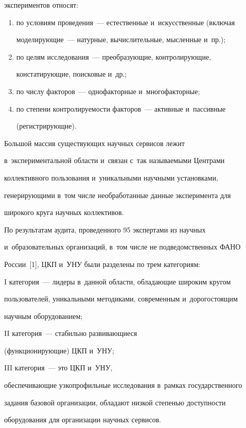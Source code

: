 экспериментов относят:

    \begin{enumerate}[(1)]

    \item по условиям проведения~--- естественные и~искусственные (включая 

моделирующие~--- натурные, вычислительные, мысленные и~пр.);

    \item по целям исследования~--- преобразующие, контролирующие, 

кон\-ста\-ти\-ру\-ющие, поисковые и~др.;

    \item по числу факторов~--- однофакторные и~многофакторные;

    \item по степени контролируемости факторов~--- активные и~пассивные 

(регистрирующие).

    \end{enumerate}

    

    Большой массив существующих научных сервисов лежит 

в~экспериментальной области и~связан с~так называемыми Центрами 

коллективного пользования и~уникальными научными установками, 

генерирующими в~том чис\-ле необработанные данные эксперимента для 

широкого круга научных коллективов.

      

      По результатам аудита, проведенного 95 экспертами из научных 

и~образовательных организаций, в~том числе не подведомственных ФАНО 

России~[1], ЦКП и~УНУ были разделены по трем категориям:

\begin{description}

\item I категория~--- лидеры в~данной области, обладающие широким кругом 

пользователей, уникальными методиками, современным и~дорогостоящим 

научным оборудованием;

\item II категория~--- стабильно развивающиеся 

(функционирующие) ЦКП и~УНУ;

\item III категория~--- это ЦКП и~УНУ, 

обеспечивающие узкопрофильные исследования в~рамках государственного 

задания базовой организации, обладают низкой степенью доступности 

оборудования для организации научных сервисов.

\end{description}

